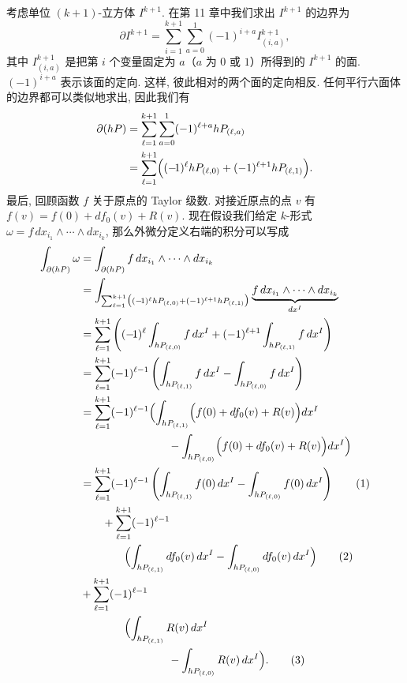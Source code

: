 考虑单位 $(k+1)$-立方体 $I^{k+1}$. 在第 11 章中我们求出 $I^{k+1}$ 的边界为
\[
\partial I^{k+1}=\sum_{i=1}^{k+1}\sum_{a=0}^{1}(-1)^{i+a}I_{(i,a)}^{k+1},
\]
其中 $I_{(i,a)}^{k+1}$ 是把第 $i$ 个变量固定为 $a$（$a$ 为 $0$ 或 $1$）所得到的 $I^{k+1}$ 的面. $(-1)^{i+a}$ 表示该面的定向. 这样, 彼此相对的两个面的定向相反. 任何平行六面体的边界都可以类似地求出, 因此我们有
\begin{align*}
\partial(hP)&=\sum_{\ell=1}^{k+1}\sum_{a=0}^{1}(-1)^{\ell+a}hP_{(\ell,a)}\\
&=\sum_{\ell=1}^{k+1}\Bigl((-\!1)^{\ell}hP_{(\ell,0)}+(-1)^{\ell+1}hP_{(\ell,1)}\Bigr).
\end{align*}
最后, 回顾函数 $f$ 关于原点的 Taylor 级数. 对接近原点的点 $v$ 有 $f(v)=f(0)+df_0(v)+R(v)$. 现在假设我们给定 $k$-形式 $\omega=f\,dx_{i_1}\wedge\cdots\wedge dx_{i_k}$, 那么外微分定义右端的积分可以写成
\begin{align*}
\int_{\partial(hP)}\omega&=\int_{\partial(hP)}f\,dx_{i_1}\wedge\cdots\wedge dx_{i_k}\\
&=\int_{\sum_{\ell=1}^{k+1}\bigl((-\!1)^{\ell}hP_{(\ell,0)}+(-1)^{\ell+1}hP_{(\ell,1)}\bigr)}
\underbrace{f\,dx_{i_1}\wedge\cdots\wedge dx_{i_k}}_{dx^I}\\
&=\sum_{\ell=1}^{k+1}\left((-\!1)^{\ell}\int_{hP_{(\ell,0)}}f\,dx^I+(-1)^{\ell+1}\int_{hP_{(\ell,1)}}f\,dx^I\right)\\
&=\sum_{\ell=1}^{k+1}(-1)^{\ell-1}\left(\int_{hP_{(\ell,1)}}f\,dx^I-\int_{hP_{(\ell,0)}}f\,dx^I\right)\\
&=\sum_{\ell=1}^{k+1}(-1)^{\ell-1}\Bigl(\int_{hP_{(\ell,1)}}\Bigl(f(0)+df_0(v)+R(v)\Bigr)dx^I\\
&\qquad\qquad\qquad\qquad-\int_{hP_{(\ell,0)}}\Bigl(f(0)+df_0(v)+R(v)\Bigr)dx^I\Bigr)\\
&=\sum_{\ell=1}^{k+1}(-1)^{\ell-1}\left(\int_{hP_{(\ell,1)}}f(0)\,dx^I-\int_{hP_{(\ell,0)}}f(0)\,dx^I\right)\tag{1}\\
&\qquad+\sum_{\ell=1}^{k+1}(-1)^{\ell-1}\\
&\qquad\qquad\Bigl(\int_{hP_{(\ell,1)}}df_0(v)\,dx^I-\int_{hP_{(\ell,0)}}df_0(v)\,dx^I\Bigr)\tag{2}\\
&+\sum_{\ell=1}^{k+1}(-1)^{\ell-1}\\
&\qquad\qquad\Bigl(\int_{hP_{(\ell,1)}}R(v)\,dx^I\\
&\qquad\qquad\qquad\qquad-\int_{hP_{(\ell,0)}}R(v)\,dx^I\Bigr).\tag{3}
\end{align*}

